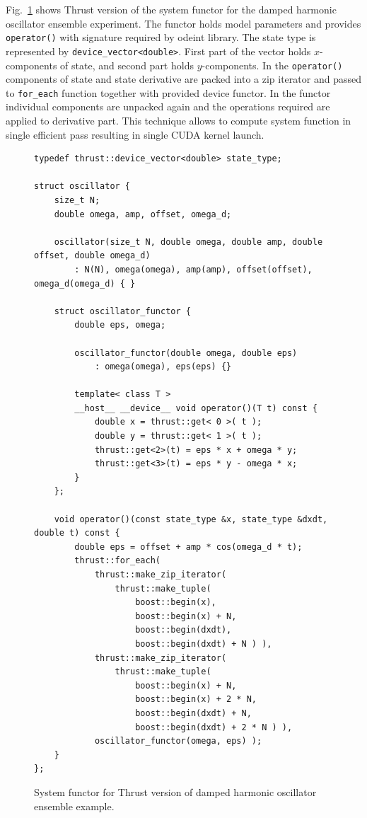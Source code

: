 \documentclass[1p]{elsarticle}
\newcommand{\code}[1]{\lstinline|#1|}
\newcommand{\figref}[1]{Fig.~\ref{#1}}
\begin{document}
\figref{code:thrust:damped} shows Thrust version of the system functor for the
damped harmonic oscillator ensemble experiment. The functor holds model
parameters and provides \code{operator()} with signature required by odeint
library. The state type is represented by \code{device_vector<double>}.  First
part of the vector holds $x$-components of state, and second part holds
$y$-components. In the \code{operator()} components of state and state
derivative are packed into a zip iterator and passed to \code{for_each}
function together with provided device functor. In the functor individual
components are unpacked again and the operations required are applied to
derivative part. This technique allows to compute system function in single
efficient pass resulting in single CUDA kernel launch.

\begin{figure}[p]
\begin{lstlisting}
typedef thrust::device_vector<double> state_type;

struct oscillator {
    size_t N;
    double omega, amp, offset, omega_d;

    oscillator(size_t N, double omega, double amp, double offset, double omega_d)
        : N(N), omega(omega), amp(amp), offset(offset), omega_d(omega_d) { }

    struct oscillator_functor {
        double eps, omega;

        oscillator_functor(double omega, double eps)
            : omega(omega), eps(eps) {}

        template< class T >
        __host__ __device__ void operator()(T t) const {
            double x = thrust::get< 0 >( t );
            double y = thrust::get< 1 >( t );
            thrust::get<2>(t) = eps * x + omega * y;
            thrust::get<3>(t) = eps * y - omega * x;
        }
    };

    void operator()(const state_type &x, state_type &dxdt, double t) const {
        double eps = offset + amp * cos(omega_d * t);
        thrust::for_each(
            thrust::make_zip_iterator(
                thrust::make_tuple(
                    boost::begin(x),
                    boost::begin(x) + N,
                    boost::begin(dxdt),
                    boost::begin(dxdt) + N ) ),
            thrust::make_zip_iterator(
                thrust::make_tuple(
                    boost::begin(x) + N,
                    boost::begin(x) + 2 * N,
                    boost::begin(dxdt) + N,
                    boost::begin(dxdt) + 2 * N ) ),
            oscillator_functor(omega, eps) );
    }
};
\end{lstlisting}
\caption{System functor for Thrust version of damped harmonic oscillator
ensemble example.}
\label{code:thrust:damped}
\end{figure}
\end{document}
